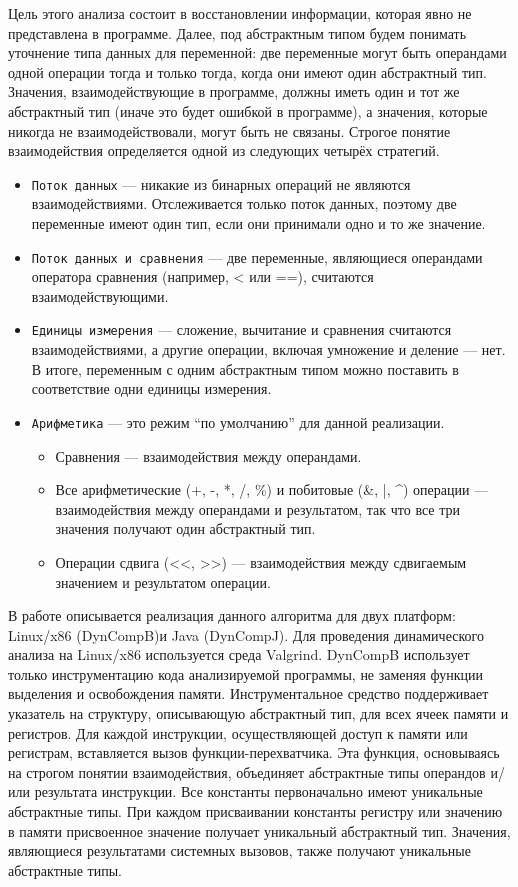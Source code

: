 \documentclass[a4paper,12pt,russian]{article}
\newcommand{\code}[1]{\textsf{#1}}
\begin{document}
Цель этого анализа состоит в восстановлении информации, которая явно не представлена в программе.
Далее, под абстрактным типом будем понимать уточнение типа данных для переменной: две переменные могут быть операндами одной операции тогда и только тогда, когда они имеют один абстрактный тип.
Значения, взаимодействующие в программе, должны иметь один и тот же абстрактный тип (иначе это будет ошибкой в программе), а значения, которые никогда не взаимодействовали, могут быть не связаны.
Строгое понятие взаимодействия определяется одной из следующих четырёх стратегий.
\begin{itemize}
\item \texttt{Поток данных} --- никакие из бинарных операций не являются взаимодействиями. Отслеживается только поток данных, поэтому две переменные имеют один тип, если они принимали одно и то же значение.
\item \texttt{Поток данных и сравнения} --- две переменные, являющиеся операндами оператора сравнения (например, \code{<} или \code{==}), считаются взаимодействующими.
\item \texttt{Единицы измерения} --- сложение, вычитание и сравнения считаются взаимодействиями, а другие операции, включая умножение и деление --- нет. В итоге, переменным с одним абстрактным типом можно поставить в соответствие одни единицы измерения.
\item \texttt{Арифметика} --- это режим ``по умолчанию'' для данной реализации.
  \begin{itemize}
    \item Сравнения --- взаимодействия между операндами.
    \item Все арифметические (\code{+}, \code{-}, \code{*}, \code{/}, \code{\%}) и побитовые (\code{\&}, \code{|}, \code{\^}) операции --- взаимодействия между операндами и результатом, так что все три значения получают один абстрактный тип.
    \item Операции сдвига (\code{<}\code{<}, \code{>}\code{>}) --- взаимодействия между сдвигаемым значением и результатом операции.
  \end{itemize}
\end{itemize}

В работе описывается реализация данного алгоритма для двух платформ: \code{Linux/x86} (\code{DynCompB})и \code{Java} (\code{DynCompJ}).
Для проведения динамического анализа на \code{Linux/x86} используется среда \code{Valgrind}.
\code{DynCompB} использует только инструментацию кода анализируемой программы, не заменяя функции выделения и освобождения памяти.
Инструментальное средство поддерживает указатель на структуру, описывающую абстрактный тип, для всех ячеек памяти и регистров.
Для каждой инструкции, осуществляющей доступ к памяти или регистрам, вставляется вызов функции-перехватчика.
Эта функция, основываясь на строгом понятии взаимодействия, объединяет абстрактные типы операндов и/или результата инструкции.
Все константы первоначально имеют уникальные абстрактные типы.
При каждом присваивании константы регистру или значению в памяти присвоенное значение получает уникальный абстрактный тип.
Значения, являющиеся результатами системных вызовов, также получают уникальные абстрактные типы.
\end{document}
